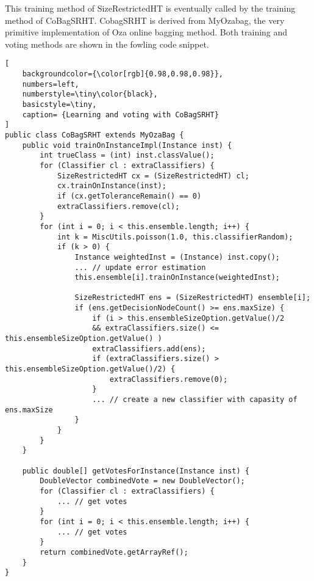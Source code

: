 This training method of SizeRestrictedHT is eventually called by the training method of CoBagSRHT. CobagSRHT is derived from MyOzabag, the very primitive implementation of Oza online bagging method. Both training and voting methods are shown in the fowling code snippet.
\begin{lstlisting}[
    backgroundcolor={\color[rgb]{0.98,0.98,0.98}},
    numbers=left,
    numberstyle=\tiny\color{black},
    basicstyle=\tiny,
    caption= {Learning and voting with CoBagSRHT}
]
public class CoBagSRHT extends MyOzaBag {
    public void trainOnInstanceImpl(Instance inst) {
        int trueClass = (int) inst.classValue();
        for (Classifier cl : extraClassifiers) {
            SizeRestrictedHT cx = (SizeRestrictedHT) cl;
            cx.trainOnInstance(inst);
            if (cx.getToleranceRemain() == 0)
            extraClassifiers.remove(cl);
        }
        for (int i = 0; i < this.ensemble.length; i++) {
            int k = MiscUtils.poisson(1.0, this.classifierRandom);
            if (k > 0) {
                Instance weightedInst = (Instance) inst.copy();
                ... // update error estimation
                this.ensemble[i].trainOnInstance(weightedInst);
                
                SizeRestrictedHT ens = (SizeRestrictedHT) ensemble[i];
                if (ens.getDecisionNodeCount() >= ens.maxSize) {
                    if (i > this.ensembleSizeOption.getValue()/2 
                    && extraClassifiers.size() <= this.ensembleSizeOption.getValue() )
                    extraClassifiers.add(ens);
                    if (extraClassifiers.size() > this.ensembleSizeOption.getValue()/2) {
                        extraClassifiers.remove(0);
                    }
                    ... // create a new classifier with capasity of ens.maxSize
                }
            }
        }
    }
    
    public double[] getVotesForInstance(Instance inst) {
        DoubleVector combinedVote = new DoubleVector();
        for (Classifier cl : extraClassifiers) {
            ... // get votes
        }
        for (int i = 0; i < this.ensemble.length; i++) {
            ... // get votes
        }
        return combinedVote.getArrayRef();
    }
}
\end{lstlisting}

